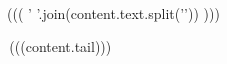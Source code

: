 \,\,\begin{underline}{((( ' '.join(content.text.split('\n')) )))}\end{underline}\,(((content.tail)))
